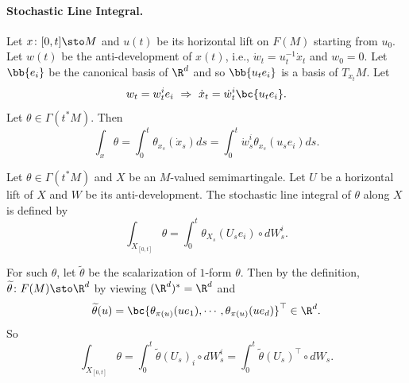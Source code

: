 \paragraph{Stochastic Line Integral.} Let $x \colon [0,t] \sto M$ and $u(t)$ be its horizontal lift on $F(M)$ starting from $u_0$. Let $w(t)$ be the anti-development of $x(t)$, i.e., $\dot{w}_t = u_t^{-1}\dot{x}_t$ and $w_0 = 0$. Let $\bb{e_i}$ be the canonical basis of $\R^d$ and so $\bb{u_te_i}$ is a basis of $T_{x_t}M$. Let
\begin{equation*}
    w_t = w^i_te_i~\Rightarrow~\dot{x}_t = \dot{w}^i_t\bc{u_te_i}.
\end{equation*}
Let $\theta \in \Gamma(t^*M)$. Then
\begin{equation*}
    \int_x \theta = \int_0^t \theta_{x_s}(\dot{x}_s)ds = \int_0^t \dot{w}^i_s\theta_{x_s}(u_se_i)ds.
\end{equation*}

\begin{defn}
    Let $\theta \in \Gamma(t^*M)$ and $X$ be an $M$-valued semimartingale. Let $U$ be a horizontal lift of $X$ and $W$ be its anti-development. The stochastic line integral of $\theta$ along $X$ is defined by
    \begin{equation*}
        \int_{X_{[0,t]}} \theta = \int_0^t \theta_{X_s}(U_se_i) \circ dW^i_s.
    \end{equation*}
\end{defn}
\begin{rmk}
    For such $\theta$, let $\widetilde{\theta}$ be the scalarization of $1$-form $\theta$. Then by the definition, $\widetilde{\theta} \colon F(M) \sto \R^d$ by viewing $(\R^d)^* = \R^d$ and 
    \begin{equation*}
        \widetilde{\theta}(u) =  \bc{\theta_{\pi(u)}(ue_1),\cdots,\theta_{\pi(u)}(ue_d)}^\top \in \R^d.
    \end{equation*}
    So
    \begin{equation*}
        \int_{X_{[0,t]}} \theta = \int_0^t \widetilde{\theta}(U_s)_i \circ dW^i_s = \int_0^t \widetilde{\theta}(U_s)^\top \circ dW_s.
    \end{equation*}
\end{rmk}

